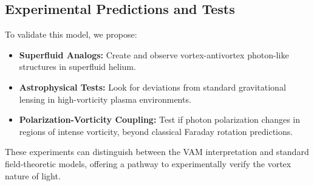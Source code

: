 \subsection{Experimental Predictions and Tests}
To validate this model, we propose:
\begin{itemize}
    \item \textbf{Superfluid Analogs:} Create and observe vortex-antivortex photon-like structures in superfluid helium.
    \item \textbf{Astrophysical Tests:} Look for deviations from standard gravitational lensing in high-vorticity plasma environments.
    \item \textbf{Polarization-Vorticity Coupling:} Test if photon polarization changes in regions of intense vorticity, beyond classical Faraday rotation predictions.
\end{itemize}

These experiments can distinguish between the VAM interpretation and standard field-theoretic models, offering a pathway to experimentally verify the vortex nature of light.